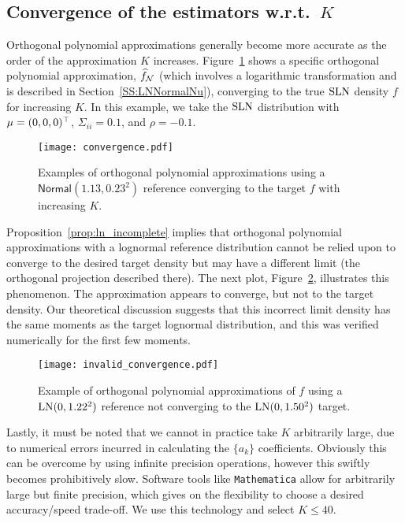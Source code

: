 \subsection{Convergence of the estimators  w.r.t.\ $K$ }

Orthogonal polynomial approximations generally become more accurate as the order of the approximation $K$ increases. Figure~\ref{fig:converg} shows a specific orthogonal polynomial approximation, $\widehat{f}_{\mathcal{N}}$ (which involves a logarithmic transformation and is described in Section~\ref{SS:LNNormalNu}), converging to the true $\mathrm{SLN}$ density $f$ for increasing $K$. In this example, we take the $\mathrm{SLN}$ distribution with $\mu=(0,0,0)^\top$, $\Sigma_{ii} = 0.1$, and $\rho = -0.1$.

\begin{figure}
\centering
\texttt{[image: convergence.pdf]}
\caption{Examples of orthogonal polynomial approximations using a $\mathsf{Normal}(1.13,0.23^2)$ reference converging to the target $f$ with increasing $K$.}
\label{fig:converg}
\end{figure}

Proposition~\ref{prop:ln_incomplete} implies that orthogonal polynomial approximations with a lognormal reference distribution cannot be relied upon to converge to the desired target density but may have a different limit (the orthogonal projection described there). The next plot, Figure~\ref{fig:bad_converge}, illustrates this phenomenon. The approximation appears to converge, but not to the target density.
Our theoretical discussion suggests that this incorrect limit density has the same moments as the target lognormal distribution,
and this was verified numerically for the first few moments.

\begin{figure}
\centering
\texttt{[image: invalid\_convergence.pdf]}

\caption{Example of orthogonal polynomial approximations of $f$ using a $\mathrm{LN}(0, 1.22^2)$ reference not converging to the $\mathrm{LN}(0, 1.50^2)$ target.}
\label{fig:bad_converge}
\end{figure}

Lastly, it must be noted that we cannot in practice take $K$ arbitrarily large, due to numerical errors incurred in calculating the $\{a_k\}$ coefficients. Obviously this can be overcome by using infinite precision operations, however this swiftly becomes prohibitively slow. Software tools like \texttt{Mathematica} allow for arbitrarily large but finite precision, which gives on the flexibility to choose a desired accuracy/speed trade-off. We use this technology and select $K \le 40$.

